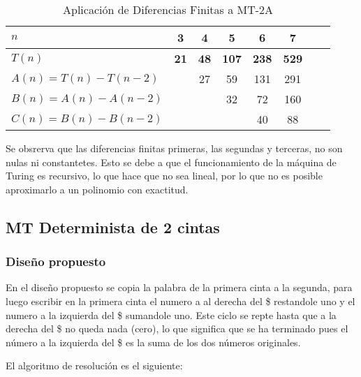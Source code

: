 \begin{table}[h]
    \centering
    \begin{tabular}{|l|c|c|c|c|c|c|c|}
        \hline
        $n$ & \textbf{3} & \textbf{4} & \textbf{5} & \textbf{6} & \textbf{7}\\ \hline
        $T(n)$ & \textbf{21} & \textbf{48} & \textbf{107} & \textbf{238} & \textbf{529}      \\ \hline
        \hline
        $A(n) = T(n) - T(n-2)$ &    & 27 & 59 & 131 & 291 \\ \hline
        $B(n) = A(n) - A(n-2)$ &    &   & 32 & 72 & 160 \\ \hline
        $C(n) = B(n) - B(n-2)$ &    &   &    & 40 & 88 \\ \hline
    \end{tabular}
    \caption{Aplicación de Diferencias Finitas a MT-2A}
\end{table}

Se obsrerva que las diferencias finitas primeras, las segundas y terceras, no son nulas ni constantetes. Esto se debe a que el funcionamiento de la máquina de Turing es recursivo, lo que hace que no sea lineal, por lo que no es posible aproximarlo a un polinomio con exactitud.\medskip




\subsection{MT Determinista de 2 cintas}

\subsubsection*{Diseño propuesto}

En el diseño propuesto se copia la palabra de la primera cinta a la segunda, para luego escribir en la primera cinta el numero a al derecha del \$ restandole uno y el numero a la izquierda del \$ sumandole uno. Este ciclo se repte hasta que a la derecha del \$ no queda nada (cero), lo que significa que se ha terminado pues el número a la izquierda del \$ es la suma de los dos números originales.\medskip

El algoritmo de resolución es el siguiente:

